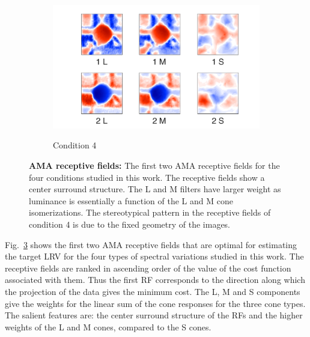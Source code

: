 \documentclass{jov}
\begin{document}
\begin{figure}
\begin{subfigure}{0.21 \textwidth}
	\label{fig:case3Filter}
    \end{subfigure}
    ~ ~ ~
        \begin{subfigure}{0.21 \textwidth}
	\caption{Condition 4}
	\includegraphics[width=\textwidth]{../Figures/Figure14/Figure14_d.pdf}
	\label{fig:case4Filter}
    \end{subfigure}
\caption{{\bf AMA receptive fields:} The first two AMA receptive fields for the four conditions studied in this work. The receptive fields show a center surround structure. The L and M filters have larger weight as luminance is essentially a function of the L and M cone isomerizations. The stereotypical pattern in the receptive fields of condition 4 is due to the fixed geometry of the images.}
 \label{fig:AMAFilters}
\end{figure}

Fig.~\ref{fig:AMAFilters} shows the first two AMA receptive fields that are optimal for estimating the target LRV for the four types of spectral variations studied in this work. The receptive fields are ranked in ascending order of the value of the cost function associated with them. Thus the first RF corresponds to the direction along which the projection of the data gives the minimum cost. The L, M and S components give the weights for the linear sum of the cone responses for the three cone types. The salient features are: the center surround structure of the RFs and the higher weights of the L and M cones, compared to the S cones. 
\end{document}
